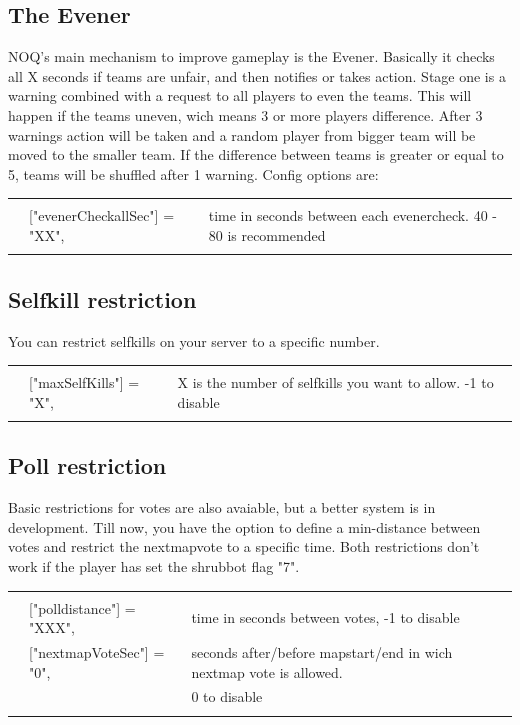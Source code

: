 \documentclass[12pt,a4paper]{article}
\begin{document}
\subsection{The Evener}

NOQ's main mechanism to improve gameplay is the Evener. 
Basically it checks all X seconds if teams are unfair, and then notifies or takes action.
Stage one is a warning combined with a request to all players to even the teams.
This will happen if the teams uneven, wich means 3 or more players difference.
After 3 warnings action will be taken and a random player from bigger team will be moved to the smaller team.
If the difference between teams is greater or equal to 5, teams will be shuffled after 1 warning.
Config options are:
\\
\begin{tabular}{l l|l}
\hline & & \\
 & 	["evenerCheckallSec"] = "XX", & time in seconds between each evenercheck. 40 - 80 is recommended  \\
  & &  \\
 \hline
\end{tabular}

\subsection{Selfkill restriction}
You can restrict selfkills on your server to a specific number.
\\
\begin{tabular}{l l|l}
\hline & & \\
 & 	["maxSelfKills"] = "X", & X is the number of selfkills you want to allow. -1 to disable  \\
  & &  \\
 \hline
\end{tabular}


\subsection{Poll restriction}
Basic restrictions for votes are also avaiable, but a better system is in development.
Till now, you have the option to define a min-distance between votes and restrict the nextmapvote to a specific time. Both restrictions don't work if the player has set the shrubbot flag "7".
\\
\begin{tabular}{l l|l}
\hline & & \\
 & 	["polldistance"] = "XXX",  & time in seconds between votes, -1 to disable \\
 &	["nextmapVoteSec"] = "0", &  seconds after/before mapstart/end in wich nextmap vote is allowed.\\
 & & 0 to disable \\
  & &  \\
 \hline
\end{tabular}
\end{document}
